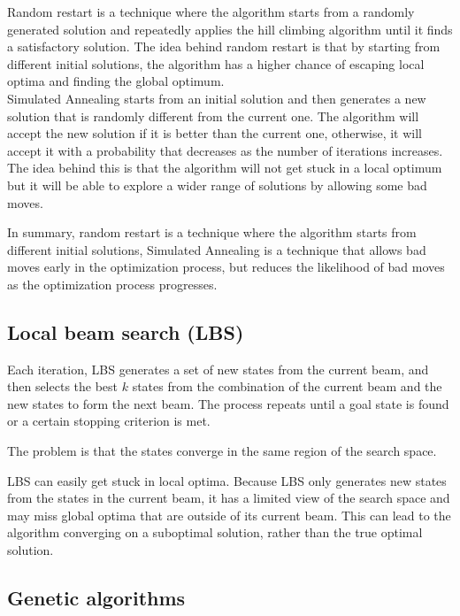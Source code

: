 \documentclass{article}
\begin{document}
Random restart is a technique where the algorithm starts from a randomly generated solution and repeatedly applies the hill climbing algorithm until it finds a satisfactory solution. The idea behind random restart is that by starting from different initial solutions, the algorithm has a higher chance of escaping local optima and finding the global optimum. \\

Simulated Annealing starts from an initial solution and then generates a new solution that is randomly different from the current one. The algorithm will accept the new solution if it is better than the current one, otherwise, it will accept it with a probability that decreases as the number of iterations increases. The idea behind this is that the algorithm will not get stuck in a local optimum but it will be able to explore a wider range of solutions by allowing some bad moves.

In summary, random restart is a technique where the algorithm starts from different initial solutions, Simulated Annealing is a technique that allows bad moves early in the optimization process, but reduces the likelihood of bad moves as the optimization process progresses.

\newpage

\subsection{Local beam search (LBS)}

Each iteration, LBS generates a set of new states from the current beam, and then selects the best $k$ states from the combination of the current beam and the new states to form the next beam. The process repeats until a goal state is found or a certain stopping criterion is met. \\

\begin{center}
The problem is that the states converge in the same region of the search space. \\     
\end{center}

LBS can easily get stuck in local optima. Because LBS only generates new states from the states in the current beam, it has a limited view of the search space and may miss global optima that are outside of its current beam. This can lead to the algorithm converging on a suboptimal solution, rather than the true optimal solution.

\subsection{Genetic algorithms}
\end{document}
